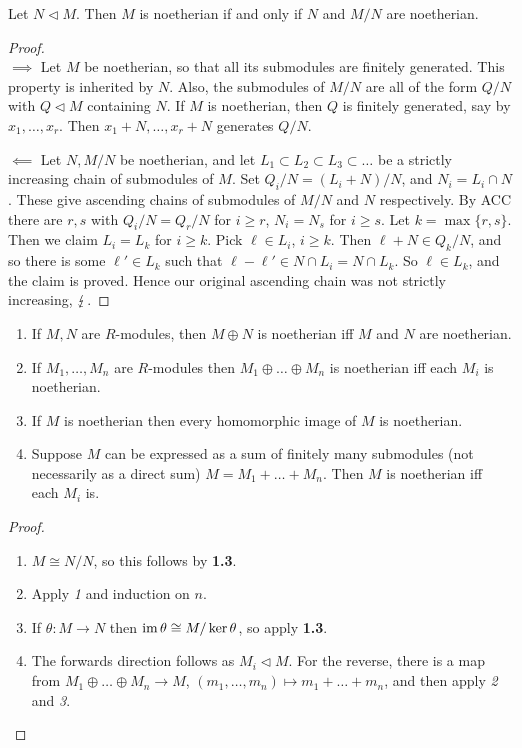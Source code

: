 \documentclass[10pt,a4paper]{article}
\begin{document}
\begin{lemma}
Let $N \triangleleft M$. Then $M$ is noetherian if and only if $N$ and $M/N$ are noetherian.
\end{lemma}
\begin{proof}\hspace*{0cm}\\
\underline{$\implies$} Let $M$ be noetherian, so that all its submodules are finitely generated. This property is inherited by $N$. Also, the submodules of $M/N$ are all of the form $Q/N$ with $Q \triangleleft M$ containing $N$. If $M$ is noetherian, then $Q$ is finitely generated, say by $x_1, \ldots, x_r$. Then $x_1 + N, \ldots, x_r+ N$ generates $Q/N$.

\underline{$\impliedby$} Let $N, M/N$ be noetherian, and let $L_1 \subset L_2 \subset L_3 \subset \ldots$ be a strictly increasing chain of submodules of $M$. Set $Q_i / N = (L_i + N)/N$, and $N_i = L_i \cap N$. These give ascending chains of submodules of $M/N$ and $N$ respectively. By ACC there are $r, s$ with $Q_i/N = Q_r/N$ for $i\geq r$, $N_i = N_s$ for $i\geq s$. Let $k = \max\{r, s\}$. Then we claim $L_i = L_k$ for $i \geq k$. Pick $\ell \in L_i$, $i \geq k$. Then $\ell + N \in Q_k/N$, and so there is some $\ell' \in L_k$ such that $\ell-\ell' \in N \cap L_i = N\cap L_k$. So $\ell \in L_k$, and the claim is proved. Hence our original ascending chain was not strictly increasing, $\lightning$.
\end{proof}
\begin{lemma}
\begin{enumerate}
\item If $M, N$ are $R$-modules, then $M \oplus N$ is noetherian iff $M$ and $N$ are noetherian.
\item If $M_1, \ldots, M_n$ are $R$-modules then $M_1 \oplus \ldots \oplus M_n$ is noetherian iff each $M_i$ is noetherian.
\item If $M$ is noetherian then every homomorphic image of $M$ is noetherian.
\item Suppose $M$ can be expressed as a sum of finitely many submodules (not necessarily as a direct sum) $M = M_1 + \ldots + M_n$. Then $M$ is noetherian iff each $M_i$ is.
\end{enumerate}
\end{lemma}
\begin{proof}
\begin{enumerate}
\item $M \cong N/N$, so this follows by \textbf{1.3}.
\item Apply \textit{1} and induction on $n$.
\item If $\theta: M \to N$ then $\operatorname{im} \theta \cong M/\ker\theta$, so apply \textbf{1.3}.
\item The forwards direction follows as $M_i \triangleleft M$. For the reverse, there is a map from $M_1 \oplus \ldots \oplus M_n \to M$, $(m_1, \ldots, m_n) \mapsto m_1+\ldots+m_n$, and then apply \textit{2} and \textit{3}.
\end{enumerate}
\end{proof}
\end{document}
